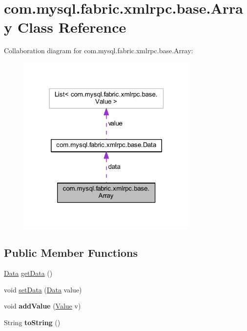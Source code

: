 \hypertarget{classcom_1_1mysql_1_1fabric_1_1xmlrpc_1_1base_1_1_array}{}\section{com.\+mysql.\+fabric.\+xmlrpc.\+base.\+Array Class Reference}
\label{classcom_1_1mysql_1_1fabric_1_1xmlrpc_1_1base_1_1_array}


Collaboration diagram for com.\+mysql.\+fabric.\+xmlrpc.\+base.\+Array\+:\nopagebreak
\begin{figure}[H]
\begin{center}
\leavevmode
\includegraphics[width=255pt]{classcom_1_1mysql_1_1fabric_1_1xmlrpc_1_1base_1_1_array__coll__graph}
\end{center}
\end{figure}
\subsection*{Public Member Functions}
\begin{DoxyCompactItemize}
\item 
\mbox{\hyperlink{classcom_1_1mysql_1_1fabric_1_1xmlrpc_1_1base_1_1_data}{Data}} \mbox{\hyperlink{classcom_1_1mysql_1_1fabric_1_1xmlrpc_1_1base_1_1_array_aad7e1390a6293640f9ca142a49fc0f68}{get\+Data}} ()
\item 
void \mbox{\hyperlink{classcom_1_1mysql_1_1fabric_1_1xmlrpc_1_1base_1_1_array_a7606bcd7ea96d0ef34153645d6272644}{set\+Data}} (\mbox{\hyperlink{classcom_1_1mysql_1_1fabric_1_1xmlrpc_1_1base_1_1_data}{Data}} value)
\item 
\mbox{\label{classcom_1_1mysql_1_1fabric_1_1xmlrpc_1_1base_1_1_array_a4bf6b9c3dd487cb1ff31294016afcec8}} 
void {\bfseries add\+Value} (\mbox{\hyperlink{classcom_1_1mysql_1_1fabric_1_1xmlrpc_1_1base_1_1_value}{Value}} v)
\item 
\mbox{\label{classcom_1_1mysql_1_1fabric_1_1xmlrpc_1_1base_1_1_array_a6f001496db2efeb79ced18b7630bc76f}} 
String {\bfseries to\+String} ()
\end{DoxyCompactItemize}
